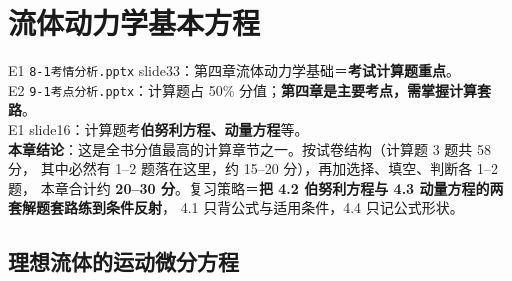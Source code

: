 \chapter{流体动力学基本方程}

\begin{yijubox}
E1 \texttt{8-1考情分析.pptx} slide33：第四章流体动力学基础＝\textbf{考试计算题重点}。\\
E2 \texttt{9-1考点分析.pptx}：计算题占 50\% 分值；\textbf{第四章是主要考点，需掌握计算套路}。\\
E1 slide16：计算题考\textbf{伯努利方程、动量方程}等。\\
\textbf{本章结论}：这是全书分值最高的计算章节之一。按试卷结构（计算题 3 题共 58 分，
其中必然有 1--2 题落在这里，约 15--20 分），再加选择、填空、判断各 1--2 题，
本章合计约 \textbf{20--30 分}。复习策略＝\textbf{把 4.2 伯努利方程与 4.3 动量方程的两套解题套路练到条件反射}，
4.1 只背公式与适用条件，4.4 只记公式形状。
\end{yijubox}

\section{理想流体的运动微分方程}

